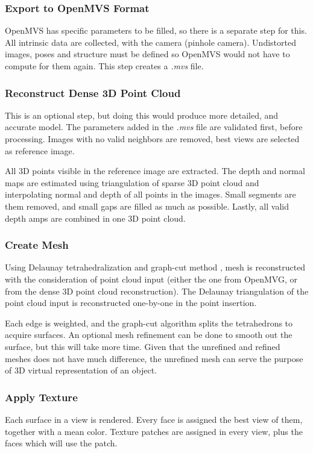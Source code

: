 \documentclass[journal]{./IEEE/IEEEtran}
\begin{document}
    \subsubsection{Export to OpenMVS Format}
    OpenMVS has specific parameters to be filled, so there is a separate step for this. All intrinsic data are collected, with the camera (pinhole camera). Undistorted images, poses and structure must be defined so OpenMVS would not have to compute for them again. This step creates a \textit{.mvs} file.
    
    \subsubsection{Reconstruct Dense 3D Point Cloud}
    This is an optional step, but doing this would produce more detailed, and accurate model. The parameters added in the \textit{.mvs} file are validated first, before processing. Images with no valid neighbors are removed, best views are selected as reference image. 
    
    All 3D points visible in the reference image are extracted. The depth and normal maps are estimated using triangulation of sparse 3D point cloud and interpolating normal and depth of all points in the images. Small segments are them removed, and small gaps are filled as much as possible. Lastly, all valid depth amps are combined in one 3D point cloud.
    
    \subsubsection{Create Mesh}
    Using Delaunay tetrahedralization \cite{Del} and graph-cut method \cite{JP}, mesh is reconstructed with the consideration of point cloud input (either the one from OpenMVG, or from the dense 3D point cloud reconstruction). The Delaunay triangulation of the point cloud input is reconstructed one-by-one in the point insertion. 
    
    Each edge is weighted, and the graph-cut algorithm splits the tetrahedrons to acquire surfaces. An optional mesh refinement can be done to smooth out the surface, but this will take more time. Given that the unrefined and refined meshes does not have much difference, the unrefined mesh can serve the purpose of 3D virtual representation of an object.
    
    \subsubsection{Apply Texture}
    Each surface in a view is rendered. Every face is assigned the best view of them, together with a mean color. Texture patches are assigned in every view, plus the faces which will use the patch.
    
\end{document}

